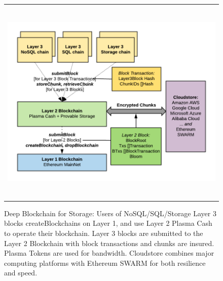\documentclass{article}
\begin{document}
\begin{figure}[t]
\begin{tabular}{c}
\centerline{\includegraphics[height=10cm]{Deep-Blockchain.png}}
\end{tabular}
\caption{Deep Blockchain for Storage:  Users of NoSQL/SQL/Storage Layer 3 blocks createBlockchains on Layer 1, and use Layer 2 Plasma Cash to operate their blockchain.  Layer 3 blocks are submitted to the Layer 2 Blockchain with block transactions and chunks are insured.  Plasma Tokens are used for bandwidth.  Cloudstore combines major computing platforms with Ethereum SWARM for both resilience and speed.}
\centering
\label{deepblockchain}
\end{figure}
\end{document}

